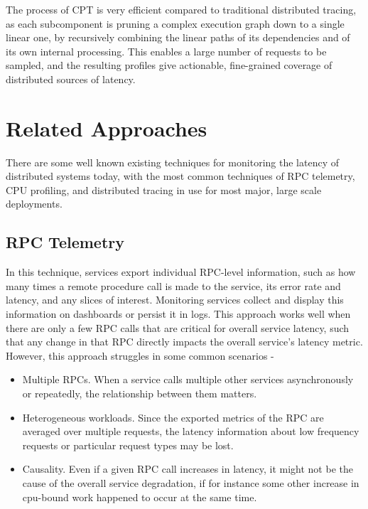 \documentclass[11pt, twoside, twocolumn]{extarticle}
\begin{document}
The process of CPT is very efficient compared to traditional distributed tracing, as each subcomponent is pruning a complex execution graph down to a single linear one, by recursively combining the linear paths of its dependencies and of its own internal processing. This enables a large number of requests to be sampled, and the resulting profiles give actionable, fine-grained coverage of distributed sources of latency.

\section{Related Approaches}

There are some well known existing techniques for monitoring the latency of distributed systems today, with the most common techniques of RPC telemetry, CPU profiling, and distributed tracing in use for most major, large scale deployments.

\subsection{RPC Telemetry}
In this technique, services export individual RPC-level information, such as how many times a remote procedure call is made to the service, its error rate and latency, and any slices of interest. Monitoring services collect and display this information on dashboards or persist it in logs. This approach works well when there are only a few RPC calls that are critical for overall service latency, such that any change in that RPC directly impacts the overall service's latency metric. However, this approach struggles in some common scenarios - 
    \begin{itemize}
    \item Multiple RPCs. When a service calls multiple other services asynchronously or repeatedly, the relationship between them matters.
    \item Heterogeneous  workloads. Since the exported metrics of the RPC are averaged over multiple requests, the latency information about low frequency requests or particular request types may be lost.
    \item Causality. Even if a given RPC call increases in latency, it might not be the cause of the overall service degradation, if for instance some other increase in cpu-bound work happened to occur at the same time.  
    \end{itemize}
    
\end{document}
